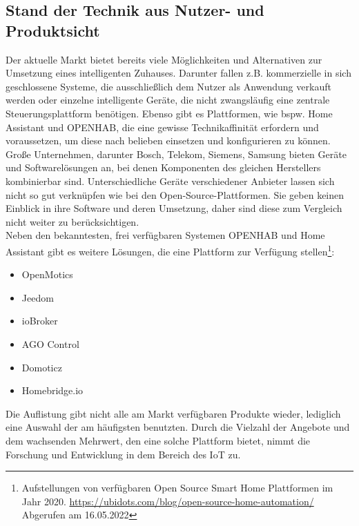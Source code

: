     \subsection{Stand der Technik aus Nutzer- und Produktsicht}
        Der aktuelle Markt bietet bereits viele Möglichkeiten und Alternativen zur Umsetzung eines intelligenten Zuhauses. 
        Darunter fallen z.B. kommerzielle in sich geschlossene Systeme, die ausschließlich dem Nutzer als Anwendung verkauft werden oder 
        einzelne intelligente Geräte, die nicht zwangsläufig eine zentrale Steuerungsplattform benötigen. Ebenso gibt es Plattformen, wie bspw. 
        Home Assistant und \acs{OPENHAB}, die eine gewisse Technikaffinität erfordern und voraussetzen, um diese nach belieben 
        einsetzen und konfigurieren zu können. Große Unternehmen, darunter Bosch, Telekom, Siemens, Samsung bieten Geräte 
        und Softwarelösungen an, bei denen Komponenten des gleichen Herstellers kombinierbar sind. Unterschiedliche Geräte verschiedener Anbieter lassen 
        sich nicht so gut verknüpfen wie bei den Open-Source-Plattformen. Sie geben keinen Einblick in ihre Software 
        und deren Umsetzung, daher sind diese zum Vergleich nicht weiter zu berücksichtigen. 
        \\
        \linebreak
        Neben den bekanntesten, frei verfügbaren Systemen \acs{OPENHAB} und Home Assistant gibt es weitere Lösungen, die eine 
        Plattform zur Verfügung stellen\footnote{Aufstellungen von verfügbaren Open Source Smart Home Plattformen im Jahr 2020. \url{https://ubidots.com/blog/open-source-home-automation/} Abgerufen am 16.05.2022}:
        \begin{itemize}
            \item OpenMotics
            \item Jeedom
            \item ioBroker
            \item AGO Control 
            \item Domoticz
            \item Homebridge.io
        \end{itemize}
        Die Auflistung gibt nicht alle am Markt verfügbaren Produkte wieder, lediglich eine Auswahl der am häufigsten benutzten. 
        Durch die Vielzahl der Angebote und dem wachsenden Mehrwert, den eine solche Plattform bietet, 
        nimmt die Forschung und Entwicklung in dem Bereich des \acs{IoT} zu. 
        \\ 
